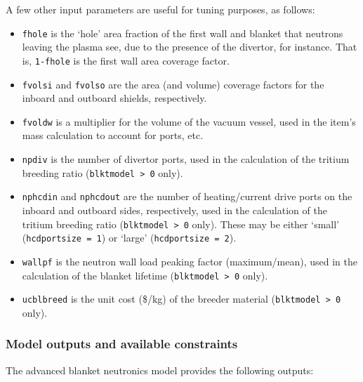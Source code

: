 \documentclass[11pt,a4paper]{report}
\begin{document}
A few other input parameters are useful for tuning purposes, as follows:

\begin{itemize}

\item \texttt{fhole} is the `hole' area fraction of the first wall and blanket
  that neutrons leaving the plasma see, due to the presence of the divertor,
  for instance. That is, \texttt{1-fhole} is the first wall area coverage
  factor.

\item \texttt{fvolsi} and \texttt{fvolso} are the area (and volume) coverage
  factors for the inboard and outboard shields, respectively.

\item \texttt{fvoldw} is a multiplier for the volume of the vacuum vessel,
  used in the item's mass calculation to account for ports, etc.

\item \texttt{npdiv} is the number of divertor ports, used in the calculation
  of the tritium breeding ratio (\texttt{blktmodel > 0} only).

\item \texttt{nphcdin} and \texttt{nphcdout} are the number of heating/current
  drive ports on the inboard and outboard sides, respectively, used in the
  calculation of the tritium breeding ratio (\texttt{blktmodel > 0}
  only). These may be either `small' (\texttt{hcdportsize = 1}) or `large'
  (\texttt{hcdportsize = 2}).

\item \texttt{wallpf} is the neutron wall load peaking factor (maximum/mean),
  used in the calculation of the blanket lifetime (\texttt{blktmodel > 0}
  only).

\item \texttt{ucblbreed} is the unit cost (\$/kg) of the breeder material
  (\texttt{blktmodel > 0} only).

\end{itemize}

\subsubsection*{Model outputs and available constraints}

The advanced blanket neutronics model provides the following outputs:
\end{document}
